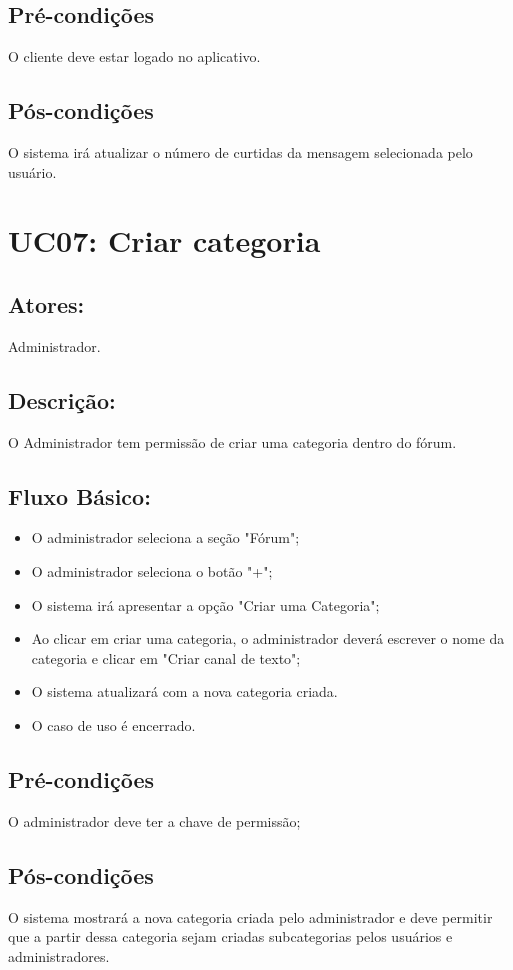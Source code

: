 \subsection{Pré-condições}
O cliente deve estar logado no aplicativo.
\subsection{Pós-condições}
O sistema irá atualizar o número de curtidas da mensagem selecionada pelo usuário. 
\section{UC07: Criar categoria}

\subsection{Atores:}
Administrador.

\subsection{Descrição:}
O Administrador tem permissão de criar uma categoria dentro do fórum. 
\subsection{Fluxo Básico:}

\begin{itemize}
    \item O administrador seleciona a seção "Fórum";
    \item O administrador seleciona o botão "+";
    \item O sistema irá apresentar a opção "Criar uma Categoria";
    \item Ao clicar em criar uma categoria, o administrador deverá escrever o nome da categoria e clicar em "Criar canal de texto";
    \item O sistema atualizará com a nova categoria criada. 
    \item O caso de uso é encerrado. 
\end{itemize}

\subsection{Pré-condições}
O administrador deve ter a chave de permissão;
\subsection{Pós-condições}
O sistema mostrará a nova categoria criada pelo administrador e deve permitir que a partir dessa categoria sejam criadas subcategorias pelos usuários e administradores. 
